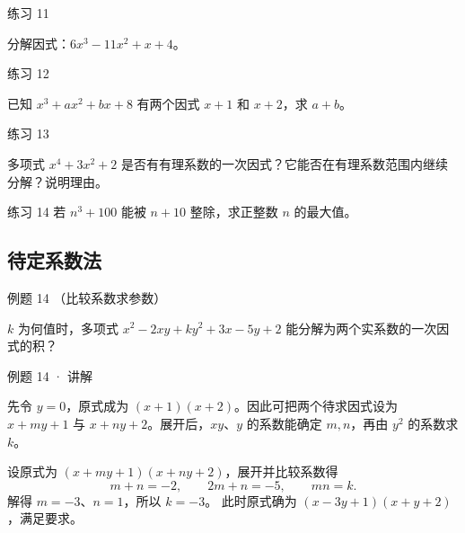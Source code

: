 
\begin{problem}{练习 11}

分解因式：$6x^3-11x^2+x+4$。

\end{problem}

\begin{problem}{练习 12}

已知 $x^3+ax^2+bx+8$ 有两个因式 $x+1$ 和 $x+2$，求 $a+b$。

\end{problem}

\begin{problem}{练习 13}

多项式 $x^4+3x^2+2$ 是否有有理系数的一次因式？它能否在有理系数范围内继续分解？说明理由。

\end{problem}

\begin{problem}{练习 14}
若 $n^3+100$ 能被 $n+10$ 整除，求正整数 $n$ 的最大值。
\end{problem}


\subsection{待定系数法}



\begin{problem}{例题 14 （比较系数求参数）}

$k$ 为何值时，多项式 $x^2-2xy+ky^2+3x-5y+2$ 能分解为两个实系数的一次因式的积？

\end{problem}


\begin{solution}{例题 14 · 讲解}

\think 先令 $y=0$，原式成为 $(x+1)(x+2)$。因此可把两个待求因式设为 $x+my+1$ 与 $x+ny+2$。展开后，$xy$、$y$ 的系数能确定 $m,n$，再由 $y^2$ 的系数求 $k$。

\solve 设原式为 $(x+my+1)(x+ny+2)$，展开并比较系数得
\[m+n=-2,\qquad 2m+n=-5,\qquad mn=k.\]
解得 $m=-3$、$n=1$，所以 $k=-3$。
此时原式确为 $(x-3y+1)(x+y+2)$，满足要求。


\end{solution}

